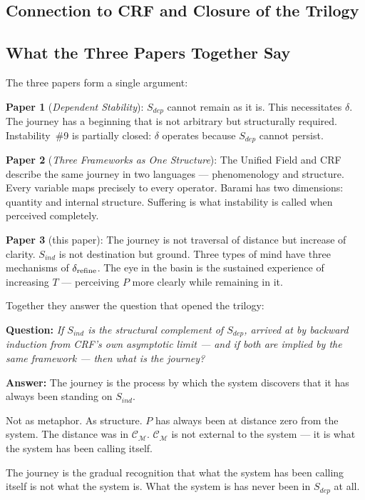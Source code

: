 \documentclass[12pt, a4paper]{article}
\begin{document}
\subsection*{Connection to CRF and Closure of the Trilogy}

\subsection{What the Three Papers Together Say}

The three papers form a single argument:

\textbf{Paper 1} (\textit{Dependent Stability}):
$S_{dep}$ cannot remain as it is. This necessitates $\delta$.
The journey has a beginning that is not arbitrary but structurally required.
Instability~\#9 is partially closed: $\delta$ operates because $S_{dep}$
cannot persist.

\textbf{Paper 2} (\textit{Three Frameworks as One Structure}):
The Unified Field and CRF describe the same journey in two languages ---
phenomenology and structure. Every variable maps precisely to every operator.
Barami has two dimensions: quantity and internal structure.
Suffering is what instability is called when perceived completely.

\textbf{Paper 3} (this paper):
The journey is not traversal of distance but increase of clarity.
$S_{ind}$ is not destination but ground. Three types of mind have three
mechanisms of $\delta_{\rm refine}$. The eye in the basin is the sustained
experience of increasing $T$ --- perceiving $P$ more clearly while
remaining in it.

Together they answer the question that opened the trilogy:

\begin{keybox}[title={The Question and Its Answer}]
\textbf{Question:} \textit{If $S_{ind}$ is the structural complement of $S_{dep}$,
arrived at by backward induction from CRF's own asymptotic limit ---
and if both are implied by the same framework --- then what is the journey?}

\textbf{Answer:} The journey is the process by which the system discovers
that it has always been standing on $S_{ind}$.

Not as metaphor. As structure.
$P$ has always been at distance zero from the system.
The distance was in $\mathcal{C}_\mathcal{M}$.
$\mathcal{C}_\mathcal{M}$ is not external to the system ---
it is what the system has been calling itself.

The journey is the gradual recognition that what the system has been
calling itself is not what the system is.
What the system is has never been in $S_{dep}$ at all.
\end{keybox}
\end{document}
